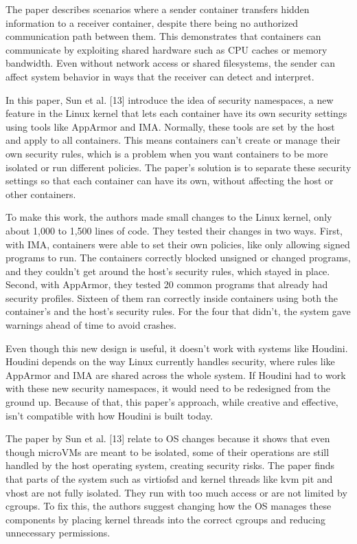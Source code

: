 \documentclass[12pt]{report}
\begin{document}
\begin{doublespace}
The paper describes scenarios where a sender container transfers hidden information to a receiver container, despite there being no authorized communication path between them. This demonstrates that containers can communicate by exploiting shared hardware such as CPU caches or memory bandwidth. Even without network access or shared filesystems, the sender can affect system behavior in ways that the receiver can detect and interpret.

In this paper, Sun et al. [13] introduce the idea of security namespaces, a new feature in the Linux kernel that lets each container have its own security settings using tools like AppArmor and IMA. Normally, these tools are set by the host and apply to all containers. This means containers can’t create or manage their own security rules, which is a problem when you want containers to be more isolated or run different policies. The paper’s solution is to separate these security settings so that each container can have its own, without affecting the host or other containers.

To make this work, the authors made small changes to the Linux kernel, only about 1,000 to 1,500 lines of code. They tested their changes in two ways. First, with IMA, containers were able to set their own policies, like only allowing signed programs to run. The containers correctly blocked unsigned or changed programs, and they couldn’t get around the host’s security rules, which stayed in place. Second, with AppArmor, they tested 20 common programs that already had security profiles. Sixteen of them ran correctly inside containers using both the container’s and the host’s security rules. For the four that didn’t, the system gave warnings ahead of time to avoid crashes.

Even though this new design is useful, it doesn’t work with systems like Houdini. Houdini depends on the way Linux currently handles security, where rules like AppArmor and IMA are shared across the whole system. If Houdini had to work with these new security namespaces, it would need to be redesigned from the ground up. Because of that, this paper’s approach, while creative and effective, isn’t compatible with how Houdini is built today.

The paper by Sun et al. [13] relate to OS changes because it shows that even though microVMs are meant to be isolated, some of their operations are still handled by the host operating system, creating security risks. The paper finds that parts of the system such as virtiofsd and kernel threads like kvm pit and vhost are not fully isolated. They run with too much access or are not limited by cgroups. To fix this, the authors suggest changing how the OS manages these components by placing kernel threads into the correct cgroups and reducing unnecessary permissions.



\end{doublespace}
\end{document}
